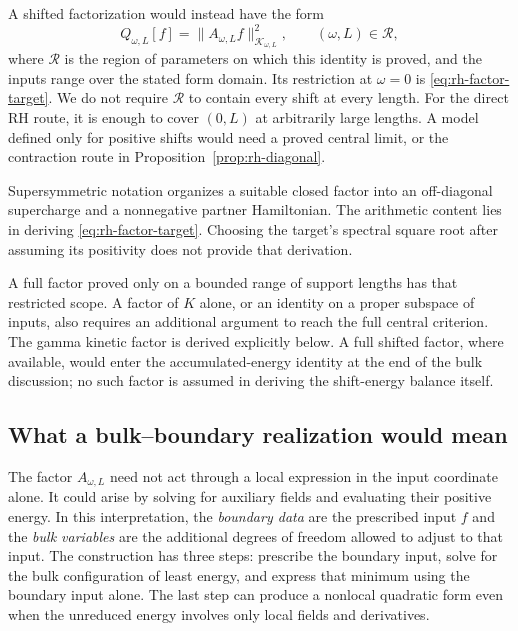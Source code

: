 A shifted factorization would instead have the form
\begin{equation}
Q_{\omega,L}[f]
=\lVert A_{\omega,L}f\rVert_{\mathcal K_{\omega,L}}^2,
\qquad (\omega,L)\in\mathcal R ,
\label{eq:rh-shift-factor-target}
\end{equation}
where $\mathcal R$ is the region of parameters on which this identity
is proved, and the inputs range over the stated form domain.
Its restriction at $\omega=0$ is \eqref{eq:rh-factor-target}.
We do not require $\mathcal R$ to contain every shift at every length.
For the direct RH route, it is enough to cover $(0,L)$ at arbitrarily
large lengths. A model defined only for positive shifts would need a
proved central limit, or the contraction route in
Proposition~\ref{prop:rh-diagonal}.

Supersymmetric notation organizes a suitable closed factor into an
off-diagonal supercharge and a nonnegative partner Hamiltonian.
The arithmetic content lies in deriving \eqref{eq:rh-factor-target}.
Choosing the target's spectral square root after assuming its positivity
does not provide that derivation.

A full factor proved only on a bounded range of support lengths has
that restricted scope. A factor of $K$ alone, or an identity on a
proper subspace of inputs, also requires an additional argument to
reach the full central criterion. The gamma kinetic factor is derived
explicitly below. A full shifted factor, where available, would enter
the accumulated-energy identity at the end of the bulk discussion;
no such factor is assumed in deriving the shift-energy balance itself.

\subsection{What a bulk--boundary realization would mean}
\label{subsec:rh-bulk}

The factor $A_{\omega,L}$ need not act through a local expression in
the input coordinate alone. It could arise by solving for auxiliary
fields and evaluating their positive energy. In this interpretation,
the \emph{boundary data} are the prescribed input $f$ and the
\emph{bulk variables} are the additional degrees of freedom allowed
to adjust to that input. The construction has three steps: prescribe
the boundary input, solve for the bulk configuration of least energy,
and express that minimum using the boundary input alone. The last
step can produce a nonlocal quadratic form even when the unreduced
energy involves only local fields and derivatives.

